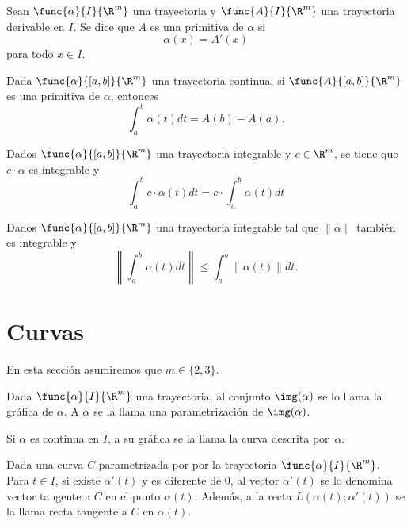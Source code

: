 \documentclass[a4,11pt]{aleph-notas}
\begin{document}
\begin{defi}
    Sean $\func{\alpha}{I}{\R^m}$ una trayectoria y $\func{A}{I}{\R^m}$ una trayectoria derivable en $I$. Se dice que $A$ es una primitiva de $\alpha$ si
    \[
        \alpha(x)=A'(x)
    \]
    para todo $x\in I$.
\end{defi}

\begin{teo}
    Dada $\func{\alpha}{[a,b]}{\R^m}$ una trayectoria continua, si $\func{A}{[a,b]}{\R^m}$ es una primitiva de $\alpha$, entonces
    \[
        \int_a^b \alpha(t) dt = A(b)-A(a).
    \]
\end{teo}

\begin{prop}
    Dados $\func{\alpha}{[a,b]}{\R^m}$ una trayectoria integrable y $c\in\R^m$, se tiene que $c\cdot \alpha$ es integrable y
    \[
        \int_a^b c\cdot \alpha(t) dt = c\cdot\int_a^b \alpha(t) dt
    \]
\end{prop}

\begin{prop}
    Dados $\func{\alpha}{[a,b]}{\R^m}$ una trayectoria integrable tal que $\|\alpha\|$ también es integrable y
    \[
        \left\| \int_a^b \alpha(t)dt \right\| \leq \int_a^b\| \alpha(t)\|dt.
    \]
\end{prop}

\section{Curvas}

En esta sección asumiremos que $m\in\{2,3\}$.

\begin{defi}[Curva]
    Dada $\func{\alpha}{I}{\R^m}$ una trayectoria, al conjunto $\img(\alpha)$ se lo llama la gráfica de $\alpha$. A $\alpha$ se la llama una parametrización de $\img(\alpha)$.

    Si $\alpha$ es continua en $I$, a su gráfica se la llama la curva descrita por~$\alpha$.
\end{defi}

\begin{defi}[Tangente]
    Dada una curva $C$ parametrizada por por la trayectoria $\func{\alpha}{I}{\R^m}$. Para $t\in I$, si existe $\alpha'(t)$ y es diferente de 0, al vector $\alpha'(t)$ se lo denomina vector tangente a $C$ en el punto $\alpha(t)$. Además, a la recta $L(\alpha(t);\alpha'(t))$ se la llama recta tangente a $C$ en $\alpha(t)$.
\end{defi}
\end{document}
